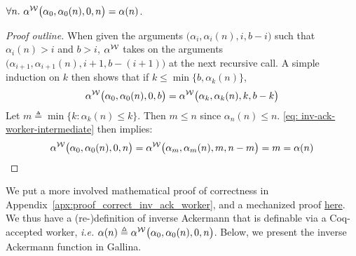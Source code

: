 \begin{thm} \label{thm: inv-ack-worker-correct}
	\href{https://github.com/inv-ack/inv-ack/blob/7270e64a2600b771f2b1b1b151f7d13fb2ae6c97/inv_ack.v#L199-L231}{\color{blue}\coq}
	$\forall n.~\alpha^{\mathcal{W}}\big(\alpha_0, \alpha_0(n), 0, n\big) = \alpha(n)$.
\end{thm}
\begin{proof}[Proof outline]
	When given the arguments $\big(\alpha_i, \alpha_i(n), i, b - i\big)$ such that $\alpha_i(n) > i$ and $b > i$, $\alpha^{\mathcal{W}}$ takes on the arguments $\big(\alpha_{i+1}, \alpha_{i+1}(n), i+1, b - (i+1)\big)$ at the next recursive call. A simple induction on $k$ then shows that if $k\le \min\big\{b, \alpha_k(n)\big\}$,
	\begin{equation} \label{eq: inv-ack-worker-intermediate}
	\alpha^{\mathcal{W}}\big(\alpha_0, \alpha_0(n), 0, b\big) = \alpha^{\mathcal{W}}\big(\alpha_k, \alpha_k(n), k, b-k\big)
	\end{equation}
	Let $m \triangleq \min\big\{k : \alpha_k(n) \le k \}$. Then $m\le n$ since $\alpha_n(n)\le n$. \eqref{eq: inv-ack-worker-intermediate} then implies:
	$$ \alpha^{\mathcal{W}}\big(\alpha_0, \alpha_0(n), 0, n\big) = \alpha^{\mathcal{W}}\big(\alpha_m, \alpha_m(n), m, n - m\big) = m = \alpha(n) $$
\end{proof}
\noindent We put a more involved mathematical proof of correctness in Appendix~\ref{apx:proof_correct_inv_ack_worker}, and a mechanized proof
	\href{https://github.com/inv-ack/inv-ack/blob/7270e64a2600b771f2b1b1b151f7d13fb2ae6c97/inv_ack.v#L163-L231}{\color{blue}here}.
We thus have a (re-)definition of inverse Ackermann that is %
definable via a Coq-accepted worker, \emph{i.e.} $\alpha(n) \triangleq \alpha^{\mathcal{W}}\big(\alpha_0, \alpha_0(n), 0, n\big)$. Below, we present the inverse
Ackermann function in Gallina.

